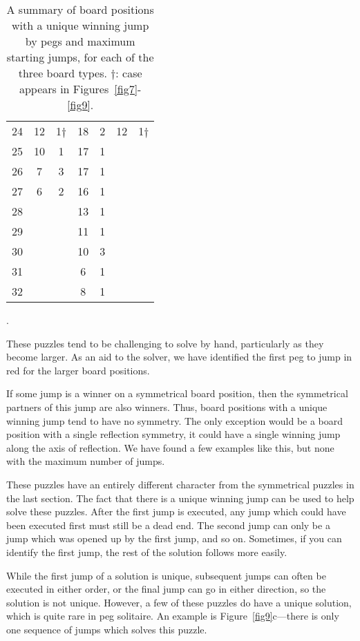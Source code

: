 \documentclass[12pt,reqno]{article}
\begin{document}
\begin{table}[!t]
\begin{center}
\begin{tabular}{ c | c  c | c  c | c  c}
24 & 12 & 1$\dagger$ & 18 & 2 & 12 & 1$\dagger$\\
25 & 10 & 1 & 17 & 1 & & \\
26 & 7 & 3 & 17 & 1 & & \\
27 & 6 & 2 & 16 & 1 & & \\
28 & & & 13 & 1 & & \\
29 & & & 11 & 1 & & \\
30 & & & 10 & 3 & & \\
31 & & & 6 & 1 & & \\
32 & & & 8 & 1 & & \\
\end{tabular}
\caption{A summary of board positions with a unique winning jump by pegs and maximum starting jumps,
for each of the three board types.
$\dagger$: case appears in Figures~\ref{fig7}-\ref{fig9}.}.
\label{tab4}
\end{center} 
\end{table}

These puzzles tend to be challenging to solve by hand, particularly as they become larger.
As an aid to the solver, we have identified the first peg to jump in red for the larger board positions.

If some jump is a winner on a symmetrical board position, then the symmetrical
partners of this jump are also winners.
Thus, board positions with a unique winning jump tend to have no symmetry.
The only exception would be a board position with a single reflection symmetry,
it could have a single winning jump along the axis of reflection.
We have found a few examples like this, but none with the maximum number of jumps.

These puzzles have an entirely different character from the symmetrical puzzles in the last section.
The fact that there is a unique winning jump can be used to help solve these puzzles.
After the first jump is executed, any jump which could have been executed first must still be a dead end.
The second jump can only be a jump which was opened up by the first jump,
and so on.
Sometimes, if you can identify the first jump, the rest of the solution follows more easily.

While the first jump of a solution is unique,
subsequent jumps can often be executed in either order,
or the final jump can go in either direction, so the solution is not unique.
However, a few of these puzzles do have a unique solution, which is quite rare in peg solitaire.
An example is Figure~\ref{fig9}c---there is only one sequence of jumps which solves this puzzle.
\end{document}
